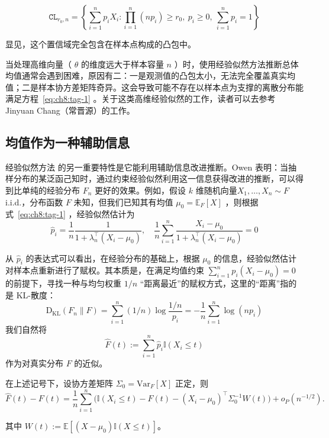 $$\mathtt{CL}_{r_0,n}=\left\{\sum_{i=1}^np_iX_i:\prod_{i=1}^n(np_i)\ge r_0,\ p_i\ge 0,\ \sum_{i=1}^np_i=1\right\}$$

显见，这个置信域完全包含在样本点构成的凸包中。

当处理高维向量（ $\theta$ 的维度远大于样本容量 $n$ ）时，使用经验似然方法推断总体均值通常会遇到困难，原因有二：一是观测值的凸包太小，无法完全覆盖真实均值；二是样本协方差矩阵奇异。这会导致可能不存在以样本点为支撑的离散分布能满足方程~\eqref{eq:ch8:tag-1} 。关于这类高维经验似然的工作，读者可以去参考 Jinyuan Chang（常晋源）的工作。

\subsection{均值作为一种辅助信息}

经验似然方法 的另一重要特性是它能利用辅助信息改进推断。Owen 表明\cite{owen2001}：当抽样分布的某泛函己知时，通过约束经验似然利用这一信息获得改进的推断，可以得到比单纯的经验分布 $F_n$ 更好的效果。例如，假设 $k$ 维随机向量$X_1,\dots,X_n\sim F$ i.i.d.，分布函数 $F$ 未知，但我们已知其有均值 $\mu_0=\mathbb{E}_F[X]$ ，则根据式~\eqref{eq:ch8:tag-1} ，经验似然估计为 
$$\widehat p_i= \frac{1}{n}\frac{1}{1 + \lambda_n^\top (X_i - \mu_0)},\quad \frac{1}{n}\sum_{i=1}^n \frac{X_i - \mu_0}{1 + \lambda_n^\top (X_i - \mu_0)} = 0$$

从 $\widehat p_i$ 的表达式可以看出，在经验分布的基础上，根据 $\mu_0$ 的信息，经验似然估计对样本点重新进行了赋权。其本质是，在满足均值约束 $\sum_{i=1}^np_i(X_i-\mu_0)=0$ 的前提下，寻找一种与均匀权重 $1/n$ ``距离最近''的赋权方式，这里的``距离''指的是 KL-散度： 
$$\mathrm{D}_{\text{KL}}(F_n\|F)=\sum_{i=1}^n(1/n)\log\frac{1/n}{p_i}=-\frac1n\sum_{i=1}^n\log(np_i)$$
我们自然将 
$$\widehat F(t):=\sum_{i=1}^n\widehat p_i\mathbb I(X_i\le t)$$
作为对真实分布 $F$ 的近似。

\begin{theorem}[辅助均值信息下的经验分布]\label{thm:ch8:auxiliary-mean-expansion}

在上述记号下，设协方差矩阵 $\Sigma_0=\mathrm{Var}_F[X]$ 正定，则
\[
\widehat{F}(t) - F(t) = \frac{1}{n}\sum_{i=1}^n \Big(\mathbb I(X_i \le t) - F(t) - (X_i-\mu_0)^\top \Sigma_0^{-1} W(t) \Big) + o_P(n^{-1/2}).
\]

其中 $W(t) := \mathbb{E}[(X-\mu_0) \mathbb I(X \le t)]$。

\end{theorem}

